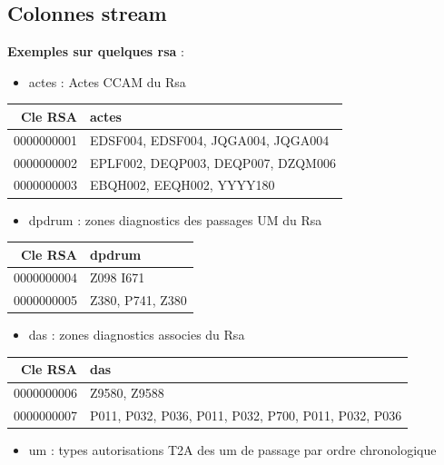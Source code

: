 \documentclass[
]{book}
\providecommand{\tightlist}{%
  \setlength{\itemsep}{0pt}\setlength{\parskip}{0pt}}
\begin{document}
\hypertarget{colonnes-stream}{%
\subsection{Colonnes stream}\label{colonnes-stream}}

\textbf{Exemples sur quelques rsa} :

\begin{itemize}
\tightlist
\item
  actes : Actes CCAM du Rsa
\end{itemize}

\begin{longtable}[]{@{}rl@{}}
\toprule
Cle RSA & actes \\
\midrule
\endhead
0000000001 & EDSF004, EDSF004, JQGA004, JQGA004 \\
0000000002 & EPLF002, DEQP003, DEQP007, DZQM006 \\
0000000003 & EBQH002, EEQH002, YYYY180 \\
\bottomrule
\end{longtable}

\begin{itemize}
\tightlist
\item
  dpdrum : zones diagnostics des passages UM du Rsa
\end{itemize}

\begin{longtable}[]{@{}rl@{}}
\toprule
Cle RSA & dpdrum \\
\midrule
\endhead
0000000004 & Z098 I671 \\
0000000005 & Z380, P741, Z380 \\
\bottomrule
\end{longtable}

\begin{itemize}
\tightlist
\item
  das : zones diagnostics associes du Rsa
\end{itemize}

\begin{longtable}[]{@{}rl@{}}
\toprule
Cle RSA & das \\
\midrule
\endhead
0000000006 & Z9580, Z9588 \\
0000000007 & P011, P032, P036, P011, P032, P700, P011, P032, P036 \\
\bottomrule
\end{longtable}

\begin{itemize}
\tightlist
\item
  um : types autorisations T2A des um de passage par ordre chronologique
\end{itemize}
\end{document}

